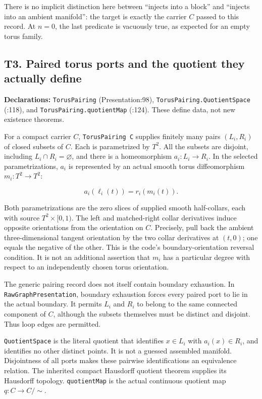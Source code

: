 \documentclass[
  letterpaper,
  11pt]{article}
\begin{document}
There is no implicit distinction here between ``injects into a block''
and ``injects into an ambient manifold'': the target is exactly the
carrier \(C\) passed to this record. At \(n=0\), the last predicate is
vacuously true, as expected for an empty torus family.

\subsection{T3. Paired torus ports and the quotient they actually
define}\label{t3}

\textbf{Declarations:} {\small\texttt{Torus\allowbreak{}Pairing}}
(Presentation:98),
{\small\texttt{Torus\allowbreak{}Pairing.\allowbreak{}Quotient\allowbreak{}Space}}
(:118), and
{\small\texttt{Torus\allowbreak{}Pairing.\allowbreak{}quotient\allowbreak{}Map}}
(:124). These define data, not new existence theorems.

For a compact carrier \(C\),
{\small\texttt{Torus\allowbreak{}Pairing C}} supplies finitely many
pairs \((L_i,R_i)\) of closed subsets of \(C\). Each is parametrized by
\(T^2\). All the subsets are disjoint, including
\(L_i\cap R_i=\varnothing\), and there is a homeomorphism
\(a_i:L_i\to R_i\). In the selected parametrizations, \(a_i\) is
represented by an actual smooth torus diffeomorphism \(m_i:T^2\to T^2\):

\[
       a_i(\ell_i(t))=r_i(m_i(t)).
\]

Both parametrizations are the zero slices of supplied smooth
half-collars, each with source \(T^2\times[0,1)\). The left and
matched-right collar derivatives induce opposite orientations from the
orientation on \(C\). Precisely, pull back the ambient three-dimensional
tangent orientation by the two collar derivatives at \((t,0)\); one
equals the negative of the other. This is the code's
boundary-orientation reversal condition. It is not an additional
assertion that \(m_i\) has a particular degree with respect to an
independently chosen torus orientation.

The generic pairing record does not itself contain boundary exhaustion.
In {\small\texttt{Raw\allowbreak{}Graph\allowbreak{}Presentation}},
boundary exhaustion forces every paired port to lie in the actual
boundary. It permits \(L_i\) and \(R_i\) to belong to the same connected
component of \(C\), although the subsets themselves must be distinct and
disjoint. Thus loop edges are permitted.

{\small\texttt{Quotient\allowbreak{}Space}} is the literal quotient that
identifies \(x\in L_i\) with \(a_i(x)\in R_i\), and identifies no other
distinct points. It is not a guessed assembled manifold. Disjointness of
all ports makes these pairwise identifications an equivalence relation.
The inherited compact Hausdorff quotient theorem supplies its Hausdorff
topology. {\small\texttt{quotient\allowbreak{}Map}} is the actual
continuous quotient map \(q:C\to C/{\sim}\).
\end{document}
